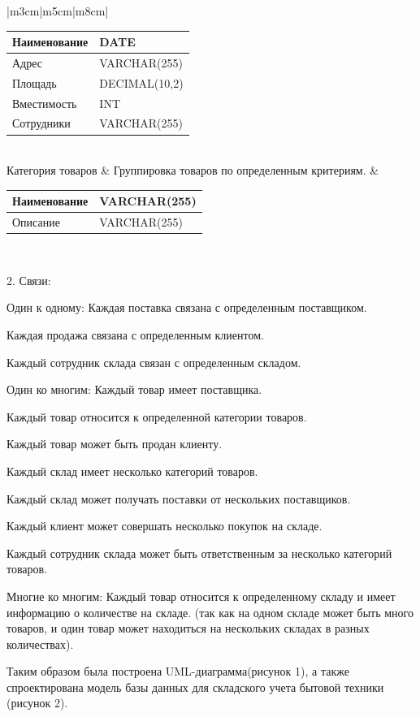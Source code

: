 \documentclass[14pt]{extreport}
\begin{document}
\begin{center}
\begin{longtable}{ |m{3cm}|m{5cm}|m{8cm}| }
\begin{center}
    \begin{tabular}{ m{4cm} | m{3.35cm} }
     Наименование & DATE \\  \hline
     Адрес & VARCHAR(255)\\  \hline
     Площадь & DECIMAL(10,2) \\   \hline
     Вместимость & INT \\   \hline
     Сотрудники & VARCHAR(255)
    \end{tabular}
\end{center}\\ 
 \hline
 Категория товаров & 
 Группировка товаров по определенным критериям. &
  \begin{center}
    \begin{tabular}{ m{4cm} | m{3.35cm} }
     Наименование & VARCHAR(255) \\  \hline
     Описание & VARCHAR(255)
    \end{tabular}
\end{center} \\ 
 \hline
\end{longtable}
\end{center}


2. Связи:

Один к одному:
Каждая поставка связана с определенным поставщиком.

Каждая продажа связана с определенным клиентом.

Каждый сотрудник склада связан с определенным складом.

Один ко многим:
Каждый товар имеет поставщика.

Каждый товар относится к определенной категории товаров.

Каждый товар может быть продан клиенту.

Каждый склад имеет несколько категорий товаров.

Каждый склад может получать поставки от нескольких поставщиков.

Каждый клиент может совершать несколько покупок на складе.

Каждый сотрудник склада может быть ответственным за несколько категорий товаров.


Многие ко многим:
Каждый товар относится к определенному складу и имеет информацию о количестве на складе. (так как на одном складе может быть много товаров, и один товар может находиться на нескольких складах в разных количествах).


Таким образом была построена UML-диаграмма(рисунок 1), а также спроектирована модель базы данных для складского учета бытовой техники (рисунок 2).
\end{document}
